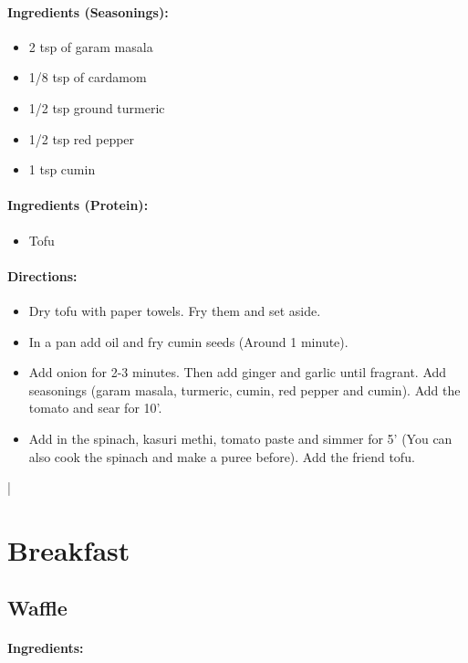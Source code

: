 \documentclass{article}
\begin{document}
\paragraph{Ingredients (Seasonings):}
\begin{itemize}
\item 2 tsp of garam masala
\item 1/8 tsp of cardamom
\item 1/2 tsp ground turmeric
\item 1/2 tsp red pepper
\item 1 tsp cumin
\end{itemize}

\paragraph{Ingredients (Protein):}
\begin{itemize}
\item Tofu
\end{itemize}

\paragraph{Directions:}
\begin{itemize}
\item Dry tofu with paper towels. Fry them and set aside.
\item In a pan add oil and fry cumin seeds (Around 1 minute). \item Add onion for 2-3 minutes. Then add ginger and garlic until fragrant. Add seasonings (garam masala, turmeric, cumin, red pepper and cumin). Add the tomato and sear for 10'.

\item Add in the spinach, kasuri methi, tomato paste and simmer for 5' (You can also cook the spinach and make a puree before). Add the friend tofu. 
\end{itemize}|

\section{Breakfast}

\subsection{Waffle}

\paragraph{Ingredients:}
\end{document}
